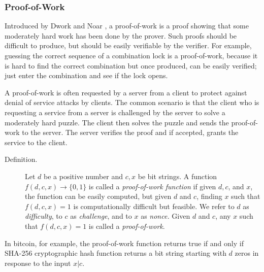 \documentclass[11pt]{article}
\theoremstyle{plain}
\begin{document}
\subsubsection{Proof-of-Work \label{subsec:Proof-of-Work}}

Introduced by Dwork and Noar \cite{Dwork1993}, a proof-of-work is
a proof showing that some moderately hard work has been done by the
prover. Such proofs should be difficult to produce, but should be
easily verifiable by the verifier. For example, guessing the correct
sequence of a combination lock is a proof-of-work, because it is hard
to find the correct combination but once produced, can be easily verified;
just enter the combination and see if the lock opens.

A proof-of-work is often requested by a server from a client to protect
against denial of service attacks by clients. The common scenario
is that the client who is requesting a service from a server is challenged
by the server to solve a moderately hard puzzle. The client then solves
the puzzle and sends the proof-of-work to the server. The server verifies
the proof and if accepted, grants the service to the client.
\begin{description}
	\item [{Definition.}] Let $d$ be a positive number and $c,x$ be bit strings.
	A function $f(d,c,x)\to\{0,1\}$ is called a \emph{proof-of-work function}
	if given $d,c$, and $x$, the function can be easily computed, but
	given $d$ and $c$, finding $x$ such that $f(d,c,x)=1$ is computationally
	difficult but feasible. We refer to $d$ as \emph{difficulty}, to
	$c$ as \emph{challenge}, and to $x$ as \emph{nonce.} Given $d$
	and $c$, any $x$ such that $f(d,c,x)=1$ is called a \emph{proof-of-work}.
\end{description}
In bitcoin, for example, the proof-of-work function returns true if
and only if SHA-256 cryptographic hash function returns a bit string
starting with $d$ zeros in response to the input $x|c$.
\end{document}
